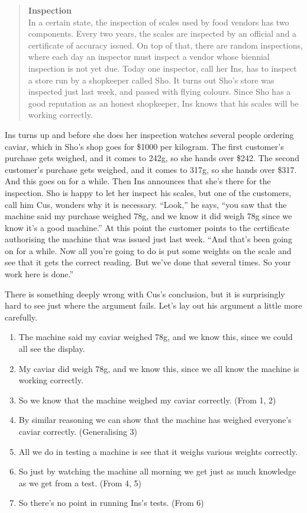 \documentclass[
  10pt,
  letterpaper,
  twoside]{scrbook}
\providecommand{\tightlist}{%
  \setlength{\itemsep}{0pt}\setlength{\parskip}{0pt}}\usepackage{longtable,booktabs,array}
\begin{document}
\begin{quote}
\textbf{Inspection}\\
In a certain state, the inspection of scales used by food vendors has
two components. Every two years, the scales are inspected by an official
and a certificate of accuracy issued. On top of that, there are random
inspections, where each day an inspector must inspect a vendor whose
biennial inspection is not yet due. Today one inspector, call her {Ins},
has to inspect a store run by a shopkeeper called {Sho}. It turns out
{Sho}'s store was inspected just last week, and passed with flying
colours. Since {Sho} has a good reputation as an honest shopkeeper,
{Ins} knows that his scales will be working correctly.
\end{quote}

{Ins} turns up and before she does her inspection watches several people
ordering caviar, which in {Sho}'s shop goes for \$1000 per kilogram. The
first customer's purchase gets weighed, and it comes to 242g, so she
hands over \$242. The second customer's purchase gets weighed, and it
comes to 317g, so she hands over \$317. And this goes on for a while.
Then {Ins} announces that she's there for the inspection. {Sho} is happy
to let her inspect his scales, but one of the customers, call him {Cus},
wonders why it is necessary. ``Look,'' he says, ``you saw that the
machine said my purchase weighed 78g, and we know it did weigh 78g since
we know it's a good machine.'' At this point the customer points to the
certificate authorising the machine that was issued just last week.
``And that's been going on for a while. Now all you're going to do is
put some weights on the scale and see that it gets the correct reading.
But we've done that several times. So your work here is done.''

There is something deeply wrong with {Cus}'s conclusion, but it is
surprisingly hard to see just where the argument fails. Let's lay out
his argument a little more carefully.

\begin{enumerate}
\def\labelenumi{\arabic{enumi}.}
\tightlist
\item
  The machine said my caviar weighed 78g, and we know this, since we
  could all see the display.
\item
  My caviar did weigh 78g, and we know this, since we all know the
  machine is working correctly.
\item
  So we know that the machine weighed my caviar correctly. (From 1, 2)
\item
  By similar reasoning we can show that the machine has weighed
  everyone's caviar correctly. (Generalising 3)
\item
  All we do in testing a machine is see that it weighs various weights
  correctly.
\item
  So just by watching the machine all morning we get just as much
  knowledge as we get from a test. (From 4, 5)
\item
  So there's no point in running {Ins}'s tests. (From 6)
\end{enumerate}
\end{document}
